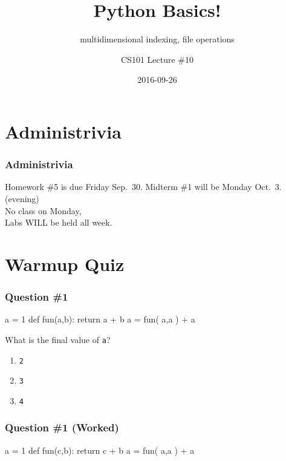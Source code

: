 \documentclass[11pt]{beamer}
\title{Python Basics!}
\subtitle{multidimensional indexing, file operations}
\author{CS101 Lecture \#10}
\date{2016-09-26}
\begin{document}
  \setcounter{showProgressBar}{0}
  \setcounter{showSlideNumbers}{0}

\frame{\titlepage}

\setcounter{framenumber}{0}
\setcounter{showProgressBar}{1}
\setcounter{showSlideNumbers}{1}

\section{Administrivia}

\begin{frame}
  \frametitle{Administrivia}
  \Enlarge
  \begin{itemize}
  \myitem  Homework \#5 is due Friday Sep.\ 30.
  \myitem  Midterm \#1 will be Monday Oct.\ 3.  (evening) \\ \textcolor{CS101GradBot}{No class on Monday, \\ Labs WILL be held all week.}
  \end{itemize}
\end{frame}

\section{Warmup Quiz}

\begin{frame}[fragile]
  \frametitle{Question \#1}
  \Enlarge

  \begin{semiverbatim}
a = 1
def fun(a,b):
    return a + b
a = fun( a,a ) + a
  \end{semiverbatim}
  What is the final value of \texttt{a}?
  \begin{enumerate}[label=\Alph*]
  \item  \texttt{2}
  \item  \texttt{3}
  \item  \texttt{4}
  \end{enumerate}
\end{frame}

\begin{frame}[fragile]
  \frametitle{Question \#1 (Worked)}
  \Enlarge

  \begin{semiverbatim}
a = 1
def fun(c,b):
    return c + b
a = fun( a,a ) + a
  \end{semiverbatim}
\end{frame}
\end{document}
